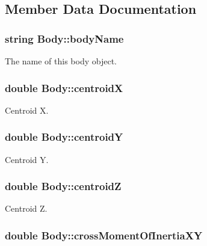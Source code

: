 \subsection{Member Data Documentation}
\hypertarget{class_body_aa1ea62768021b84bb1c290c6bfaedbfe}{
\subsubsection[{body\-Name}]{\setlength{\rightskip}{0pt plus 5cm}string Body\-::body\-Name}}\label{class_body_aa1ea62768021b84bb1c290c6bfaedbfe}
The name of this body object. \hypertarget{class_body_a5dc912a4a096590e90fd681a01ffc708}{
\subsubsection[{centroid\-X}]{\setlength{\rightskip}{0pt plus 5cm}double Body\-::centroid\-X}}\label{class_body_a5dc912a4a096590e90fd681a01ffc708}
Centroid X. \hypertarget{class_body_aac1b166131421c882d1ec647b740c865}{
\subsubsection[{centroid\-Y}]{\setlength{\rightskip}{0pt plus 5cm}double Body\-::centroid\-Y}}\label{class_body_aac1b166131421c882d1ec647b740c865}
Centroid Y. \hypertarget{class_body_a834c22ac029cd86bc72185f027cdf74f}{
\subsubsection[{centroid\-Z}]{\setlength{\rightskip}{0pt plus 5cm}double Body\-::centroid\-Z}}\label{class_body_a834c22ac029cd86bc72185f027cdf74f}
Centroid Z. \hypertarget{class_body_afd989f0185a85ef68120e88d6564631f}{
\subsubsection[{cross\-Moment\-Of\-Inertia\-X\-Y}]{\setlength{\rightskip}{0pt plus 5cm}double Body\-::cross\-Moment\-Of\-Inertia\-X\-Y}}\label{class_body_afd989f0185a85ef68120e88d6564631f}
